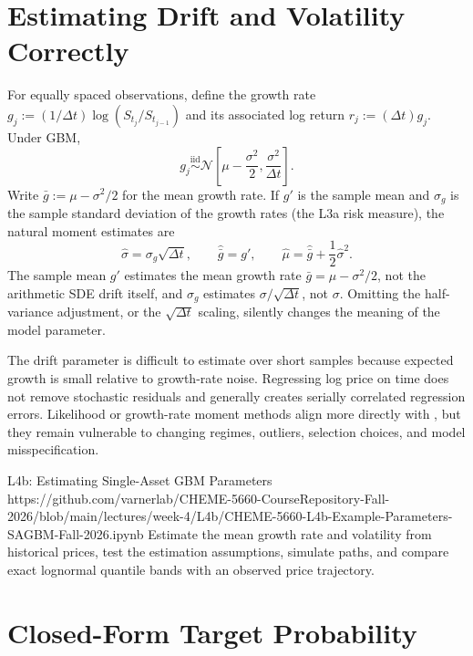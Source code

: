 \documentclass[11pt]{article}
\begin{document}
\section{Estimating Drift and Volatility Correctly}

For equally spaced observations, define the growth rate $g_j:=(1/\Delta t)\log(S_{t_j}/S_{t_{j-1}})$ and its associated log return $r_j:=(\Delta t)g_j$. Under GBM,
\begin{equation}
  \label{eq:log-return-law}
  g_j\overset{\mathrm{iid}}{\sim}
  \mathcal{N}\!\left[
  \mu-\frac{\sigma^2}{2},
  \frac{\sigma^2}{\Delta t}
  \right].
\end{equation}
Write $\bar g:=\mu-\sigma^2/2$ for the mean growth rate. If $g'$ is the sample mean and $\sigma_g$ is the sample standard deviation of the growth rates (the L3a risk measure), the natural moment estimates are
\begin{equation}
  \label{eq:gbm-estimates}
  \widehat\sigma=\sigma_g\sqrt{\Delta t},
  \qquad
  \widehat{\bar g}=g',
  \qquad
  \widehat\mu=\widehat{\bar g}+\frac{1}{2}\widehat\sigma^2.
\end{equation}
The sample mean $g'$ estimates the mean growth rate $\bar g=\mu-\sigma^2/2$, not the arithmetic SDE drift itself, and $\sigma_g$ estimates $\sigma/\sqrt{\Delta t}$, not $\sigma$. Omitting the half-variance adjustment, or the $\sqrt{\Delta t}$ scaling, silently changes the meaning of the model parameter.

The drift parameter is difficult to estimate over short samples because expected growth is small relative to growth-rate noise. Regressing log price on time does not remove stochastic residuals and generally creates serially correlated regression errors. Likelihood or growth-rate moment methods align more directly with , but they remain vulnerable to changing regimes, outliers, selection choices, and model misspecification.

\notebooklink
  {L4b: Estimating Single-Asset GBM Parameters}
  {https://github.com/varnerlab/CHEME-5660-CourseRepository-Fall-2026/blob/main/lectures/week-4/L4b/CHEME-5660-L4b-Example-Parameters-SAGBM-Fall-2026.ipynb}
  {Estimate the mean growth rate and volatility from historical prices, test the estimation assumptions, simulate paths, and compare exact lognormal quantile bands with an observed price trajectory.}

\section{Closed-Form Target Probability}
\end{document}
